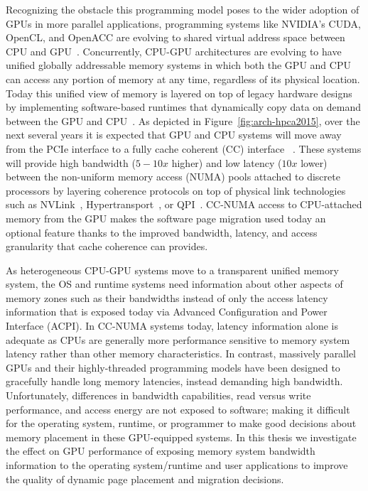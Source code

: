 Recognizing the obstacle this programming model poses to the wider adoption of
GPUs in more parallel applications, programming systems like NVIDIA's CUDA,
OpenCL, and OpenACC are evolving to shared virtual address space between CPU and
GPU~\cite{UVM}. Concurrently, CPU-GPU architectures are evolving to have unified
globally addressable memory systems in which both the GPU and CPU can access any
portion of memory at any time, regardless of its physical location.  Today this
unified view of memory is layered on top of legacy hardware designs by
implementing software-based runtimes that dynamically copy data on demand
between the GPU and CPU~\cite{cuda}. As depicted in
Figure~\ref{fig:arch-hpca2015}, over the next several years it is expected that
GPU and CPU systems will move away from the PCIe interface to a fully cache
coherent (CC) interface ~\cite{AMDHSA}. These systems will provide high
bandwidth ($5-10x$ higher) and low latency ($10x$ lower) between the non-uniform memory
access (NUMA) pools attached to discrete processors by layering coherence
protocols on top of physical link technologies such as NVLink~\cite{NVLINK},
Hypertransport~\cite{AMDHT}, or QPI~\cite{INTELQPI}.   CC-NUMA access to
CPU-attached memory from the GPU makes the software page migration used today an
optional feature thanks to the improved bandwidth, latency, and access
granularity that cache coherence can provides.

As heterogeneous CPU-GPU systems move to a transparent unified memory system,
the OS and runtime systems need information about other aspects of memory zones
such as their bandwidths instead of only the access latency information that is
exposed today via Advanced Configuration and Power Interface (ACPI). In CC-NUMA
systems today, latency information alone is adequate as CPUs are generally more
performance sensitive to memory system latency rather than other memory
characteristics. In contrast, massively parallel GPUs and their highly-threaded
programming models have been designed to gracefully handle long memory
latencies, instead demanding high bandwidth. Unfortunately, differences in
bandwidth capabilities, read versus write performance, and access energy are not
exposed to software; making it difficult for the operating system, runtime, or
programmer to make good decisions about memory placement in these GPU-equipped
systems. In this thesis we investigate the effect on GPU performance of exposing
memory system bandwidth information to the operating system/runtime and user
applications to improve the quality of dynamic page placement and migration
decisions.

